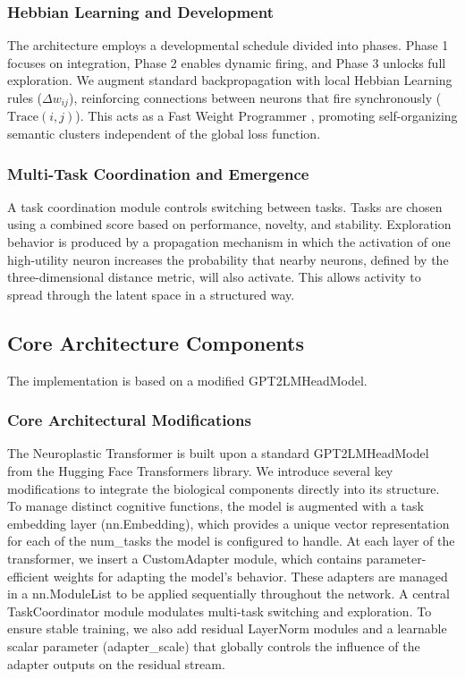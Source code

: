 \documentclass[11pt, letterpaper]{article}
\begin{document}
\subsubsection{Hebbian Learning and Development}
The architecture employs a developmental schedule divided into phases. Phase 1 focuses on integration, Phase 2 enables dynamic firing, and Phase 3 unlocks full exploration. We augment standard backpropagation with local Hebbian Learning rules ($\Delta w_{ij}$), reinforcing connections between neurons that fire synchronously ($\text{Trace}(i,j)$). This acts as a Fast Weight Programmer \cite{linear_transformers}, promoting self-organizing semantic clusters independent of the global loss function.

\subsubsection{Multi-Task Coordination and Emergence}
A task coordination module controls switching between tasks. Tasks are chosen using a combined score based on performance, novelty, and stability. Exploration behavior is produced by a propagation mechanism in which the activation of one high-utility neuron increases the probability that nearby neurons, defined by the three-dimensional distance metric, will also activate. This allows activity to spread through the latent space in a structured way.

\subsection{Core Architecture Components}
The implementation is based on a modified GPT2LMHeadModel.

\subsubsection{Core Architectural Modifications}
The Neuroplastic Transformer is built upon a standard GPT2LMHeadModel from the Hugging Face Transformers library. We introduce several key modifications to integrate the biological components directly into its structure. To manage distinct cognitive functions, the model is augmented with a task embedding layer (nn.Embedding), which provides a unique vector representation for each of the num\_tasks the model is configured to handle.
At each layer of the transformer, we insert a CustomAdapter module, which 
contains parameter-efficient weights for adapting the model's behavior.
These adapters are managed in a nn.ModuleList to be applied sequentially 
throughout the network. A central TaskCoordinator module modulates multi-task switching and exploration. To ensure stable training, we also add residual LayerNorm modules and a learnable scalar parameter (adapter\_scale) that globally controls the influence of the adapter outputs on the residual stream.
\end{document}
